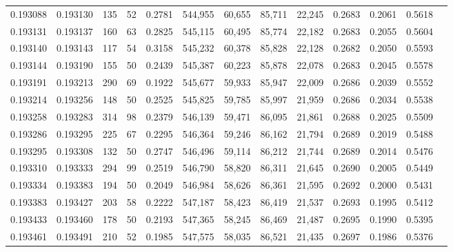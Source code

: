 \begin{tabular}{rrrrrrrrrrrrr}
0.193088 & 0.193130 &   135 &  52 &                                     0.2781 & 544,955 &  60,655 &  85,711 &  22,245 & 0.2683 & 0.2061 & 0.5618 \\
0.193131 & 0.193137 &   160 &  63 &                                     0.2825 & 545,115 &  60,495 &  85,774 &  22,182 & 0.2683 & 0.2055 & 0.5604 \\
0.193140 & 0.193143 &   117 &  54 &                                     0.3158 & 545,232 &  60,378 &  85,828 &  22,128 & 0.2682 & 0.2050 & 0.5593 \\
0.193144 & 0.193190 &   155 &  50 &                                     0.2439 & 545,387 &  60,223 &  85,878 &  22,078 & 0.2683 & 0.2045 & 0.5578 \\
0.193191 & 0.193213 &   290 &  69 &                                     0.1922 & 545,677 &  59,933 &  85,947 &  22,009 & 0.2686 & 0.2039 & 0.5552 \\
0.193214 & 0.193256 &   148 &  50 &                                     0.2525 & 545,825 &  59,785 &  85,997 &  21,959 & 0.2686 & 0.2034 & 0.5538 \\
0.193258 & 0.193283 &   314 &  98 &                                     0.2379 & 546,139 &  59,471 &  86,095 &  21,861 & 0.2688 & 0.2025 & 0.5509 \\
0.193286 & 0.193295 &   225 &  67 &                                     0.2295 & 546,364 &  59,246 &  86,162 &  21,794 & 0.2689 & 0.2019 & 0.5488 \\
0.193295 & 0.193308 &   132 &  50 &                                     0.2747 & 546,496 &  59,114 &  86,212 &  21,744 & 0.2689 & 0.2014 & 0.5476 \\
0.193310 & 0.193333 &   294 &  99 &                                     0.2519 & 546,790 &  58,820 &  86,311 &  21,645 & 0.2690 & 0.2005 & 0.5449 \\
0.193334 & 0.193383 &   194 &  50 &                                     0.2049 & 546,984 &  58,626 &  86,361 &  21,595 & 0.2692 & 0.2000 & 0.5431 \\
0.193383 & 0.193427 &   203 &  58 &                                     0.2222 & 547,187 &  58,423 &  86,419 &  21,537 & 0.2693 & 0.1995 & 0.5412 \\
0.193433 & 0.193460 &   178 &  50 &                                     0.2193 & 547,365 &  58,245 &  86,469 &  21,487 & 0.2695 & 0.1990 & 0.5395 \\
0.193461 & 0.193491 &   210 &  52 &                                     0.1985 & 547,575 &  58,035 &  86,521 &  21,435 & 0.2697 & 0.1986 & 0.5376 \\

\end{tabular}
